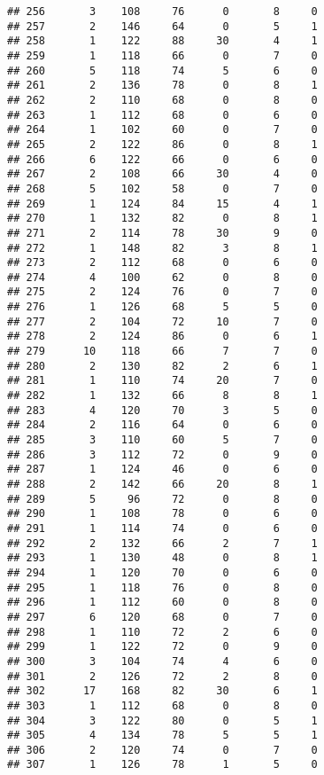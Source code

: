 \documentclass[
]{article}
\begin{document}
\begin{verbatim}
## 256       3    108     76      0       8     0
## 257       2    146     64      0       5     1
## 258       1    122     88     30       4     1
## 259       1    118     66      0       7     0
## 260       5    118     74      5       6     0
## 261       2    136     78      0       8     1
## 262       2    110     68      0       8     0
## 263       1    112     68      0       6     0
## 264       1    102     60      0       7     0
## 265       2    122     86      0       8     1
## 266       6    122     66      0       6     0
## 267       2    108     66     30       4     0
## 268       5    102     58      0       7     0
## 269       1    124     84     15       4     1
## 270       1    132     82      0       8     1
## 271       2    114     78     30       9     0
## 272       1    148     82      3       8     1
## 273       2    112     68      0       6     0
## 274       4    100     62      0       8     0
## 275       2    124     76      0       7     0
## 276       1    126     68      5       5     0
## 277       2    104     72     10       7     0
## 278       2    124     86      0       6     1
## 279      10    118     66      7       7     0
## 280       2    130     82      2       6     1
## 281       1    110     74     20       7     0
## 282       1    132     66      8       8     1
## 283       4    120     70      3       5     0
## 284       2    116     64      0       6     0
## 285       3    110     60      5       7     0
## 286       3    112     72      0       9     0
## 287       1    124     46      0       6     0
## 288       2    142     66     20       8     1
## 289       5     96     72      0       8     0
## 290       1    108     78      0       6     0
## 291       1    114     74      0       6     0
## 292       2    132     66      2       7     1
## 293       1    130     48      0       8     1
## 294       1    120     70      0       6     0
## 295       1    118     76      0       8     0
## 296       1    112     60      0       8     0
## 297       6    120     68      0       7     0
## 298       1    110     72      2       6     0
## 299       1    122     72      0       9     0
## 300       3    104     74      4       6     0
## 301       2    126     72      2       8     0
## 302      17    168     82     30       6     1
## 303       1    112     68      0       8     0
## 304       3    122     80      0       5     1
## 305       4    134     78      5       5     1
## 306       2    120     74      0       7     0
## 307       1    126     78      1       5     0

\end{verbatim}
\end{document}
